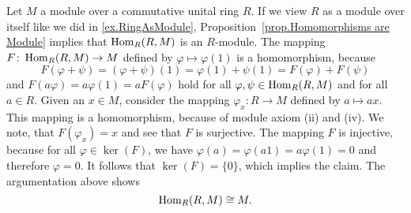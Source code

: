 \begin{rem}
Let $M$ a module over a commutative unital ring $R$. If we view $R$ as a module over itself like we did in \cref{ex.RingAsModule}, Proposition~\ref{prop.Homomorphisms are Module} implies that $\operatorname{\mathrm{Hom}}_R(R,M)$ is an $R$-module. The mapping $F\colon\operatorname{\mathrm{Hom}}_R(R,M)\to M$ defined by $\varphi\mapsto\varphi(1)$ is a homomorphism, because 
\begin{equation*}
F(\varphi+\psi)=(\varphi+\psi)(1)=\varphi(1)+\psi(1)=F(\varphi)+F(\psi)
\end{equation*}
and $F(a\varphi)=a\varphi(1)=aF(\varphi)$ hold for all $\varphi,\psi\in\operatorname{\mathrm{Hom}}_R(R,M)$ and for all $a\in R$. Given an $x\in M$, consider the mapping $\varphi_x\colon R\to M$ defined by $a\mapsto ax$. This mapping is a homomorphism, because of module axiom (ii) and (iv). We note, that $F(\varphi_x)=x$ and see that $F$ is surjective. The mapping $F$ is injective, because for all $\varphi\in\ker(F)$, we have $\varphi(a)=\varphi(a1)=a\varphi(1)=0$ and therefore $\varphi=0$. It follows that $\ker(F)=\lbrace 0\rbrace$, which implies the claim. The argumentation above shows
\begin{equation*}
\operatorname{\mathrm{Hom}}_R(R,M)\cong M.
\end{equation*}
\end{rem}